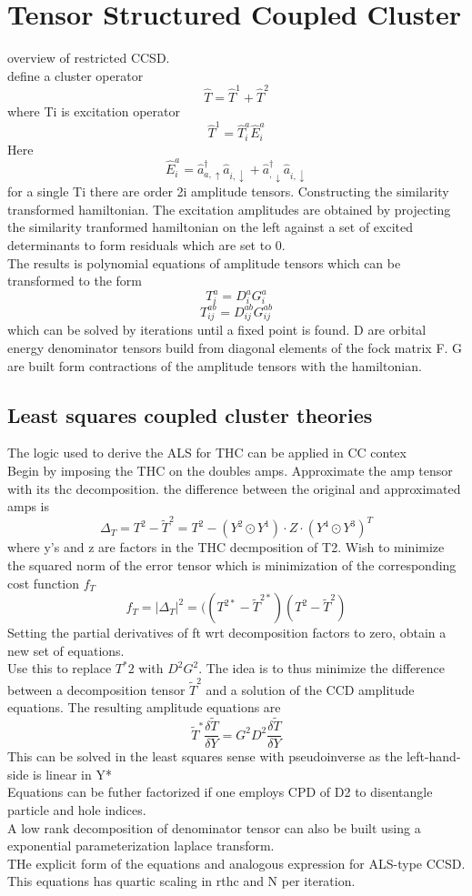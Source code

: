 \documentclass[10pt, draft]{article}
\begin{document}
\section{Tensor Structured Coupled Cluster}
overview of restricted CCSD.\\
define a cluster operator 
\[\hat{T} = \hat{T}^1 + \hat{T}^2\]
where Ti is excitation operator 
\[\hat{T}^1 = \hat{T}^a_i \hat{E}_i^a\]
Here 
\[\hat{E}_i^a = \hat{a}_{a , \uparrow}^\dagger \hat{a}_{i, \downarrow} + \hat{a}_{, \downarrow}^\dagger \hat{a}_{i, \downarrow}\]
for a single Ti there are order 2i amplitude tensors. Constructing the similarity transformed hamiltonian. The excitation amplitudes are obtained by projecting the similarity tranformed hamiltonian on the left against a set of excited determinants to form residuals which are set to 0.\\
The results is polynomial equations of amplitude tensors which can be transformed to the form 
\[ T^a_i = D^a_i G^a_i\]
\[T^{ab}_{ij} = D^{ab}_{ij} G^{ab}_{ij}\]
which can be solved by iterations until a fixed point is found.  D are orbital energy denominator tensors build from diagonal elements of the fock matrix F.
G are built form contractions of the amplitude tensors with the hamiltonian.

\subsection{Least squares coupled cluster theories}

The logic used to derive the ALS for THC can be applied in CC contex\\
Begin by imposing the THC on the doubles amps.  Approximate the amp tensor with its thc decomposition.  the difference between the original and approximated amps is 
\[\Delta_T = T^2 - \tilde{T}^2 = T^2 - (Y^2 \odot Y^1) \cdot Z \cdot ( Y^4 \odot Y^3) ^T\]
where y's and z are factors in the THC decmposition of T2. Wish to minimize the squared norm of the error tensor which is minimization of the corresponding cost function $f_T$
\[f_T = |\Delta_T|^2 = ((T^{2*} - \tilde{T}^{2*}) ( T^2 - \tilde{T}^2)\]
Setting the partial derivatives of ft wrt decomposition factors to zero, obtain a new set of equations.\\
Use this to replace $T^*2$ with $D^2G^2$.  The idea is to thus minimize the difference between a decomposition tensor $\tilde{T}^2$ and a solution of the CCD amplitude equations. The resulting amplitude equations are 
\[\tilde{T}^* \frac{\delta\tilde{T}}{\delta Y} = G^2 D^2 \frac{\delta \tilde{T}}{\delta Y}\]
This can be solved in the least squares sense with pseudoinverse as the left-hand-side is linear in Y*\\
Equations can be futher factorized if one employs CPD of D2 to disentangle particle and hole indices.  \\
A low rank decomposition of denominator tensor can also be built using a exponential parameterization laplace transform.\\
THe explicit form of the equations and analogous expression for ALS-type CCSD.  This equations has quartic scaling in rthc and N per iteration.  
\end{document}
